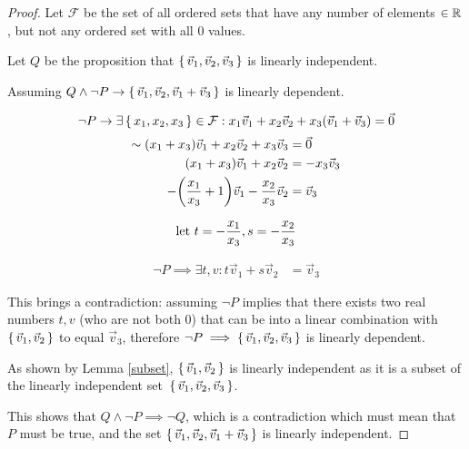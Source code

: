 \documentclass{exam}
\theoremstyle{plain}
\theoremstyle{definition}
\begin{document}
\begin{proof}

	Let $\mathcal F$ be the set of all ordered sets that have any number of elements $\in {\mathbb R}$, but not any ordered set with all 0 values.

	Let $Q$ be the proposition that $\set{\vec v_1, \vec v_2, \vec v_3}$ is linearly independent.

	Assuming $Q \wedge \neg P \rightarrow \set{\vec v_1, \vec v_2, \vec v_1 + \vec v_3}$ is linearly dependent.

	$$
		\neg P \rightarrow \exists \set{x_1,x_2,x_3} \in \mathcal F : x_1 \vec v_1 + x_2 \vec v_2 + x_3 { \left(\vec v_1 + \vec v_3\right) } = \vec 0
	$$
	\begin{align*}
		\sim
		{ \left(x_1 + x_3\right) } {\vec v_1} + x_2 \vec v_2 + x_3 \vec v_3    & = \vec 0         \\
		{ \left(x_1+x_3\right) }\vec v_1 + x_2\vec v_2                         & = - x_3 \vec v_3 \\
		-{ \left(\frac{x_1}{x_3} + 1\right) }\vec v_1 -\frac{x_2}{x_3}\vec v_2 & = \vec v_3
	\end{align*}

	$$
		{\text{let } } t = -\frac{x_1}{x_3}, s=-\frac{x_2}{x_3}
	$$

	\begin{align*}
		\neg P \implies \exists t,v : t\vec v_1 + s \vec v_2 & = \vec v_3
	\end{align*}

	This brings a contradiction: assuming $\neg P$ implies that there exists two real numbers $t, v$ (who are not both $0$) that can be into a linear combination with $\set{\vec v_1, \vec v_2}$ to equal $\vec v_3$, therefore $\neg P \implies \set{\vec v_1, \vec v_2, \vec v_3}$ is linearly dependent.

	As shown by Lemma \ref{subset}, $\set{\vec v_1, \vec v_2}$ is linearly independent as it is a subset of the linearly independent set~$\set{\vec v_1, \vec v_2, \vec v_3}$.

	This shows that $Q\wedge \neg P \implies \neg Q$, which is a contradiction which must mean that $P$ must be true, and the set $\set{\vec v_1,\vec v_2, \vec v_1+\vec v_3}$ is linearly independent.



\end{proof}
\end{document}
